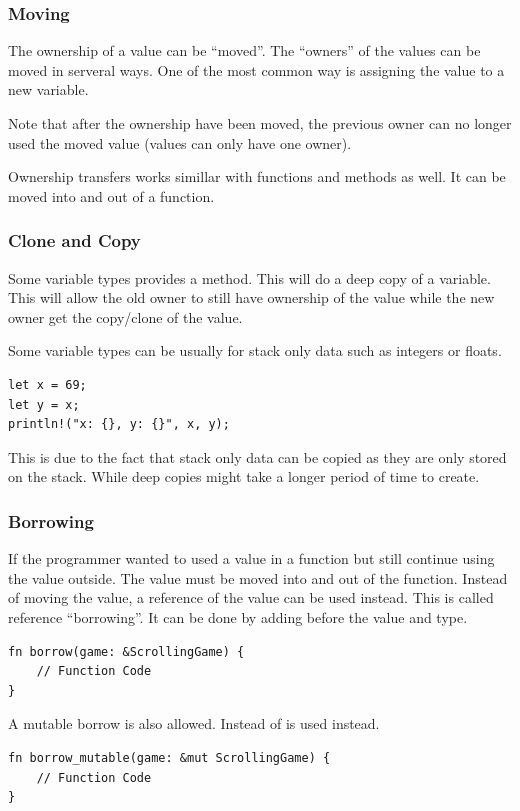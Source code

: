 \documentclass{beamer}
\begin{document}
\begin{frame}[allowframebreaks]
  \frametitle{Moving}
  The ownership of a value can be ``moved''. The ``owners'' of the values can be moved in serveral ways. One of the most common way is assigning the value to a new variable.

  

  \alert{Note} that after the ownership have been moved, the previous owner can no longer used the moved value (values can only have one owner).

  \pagebreak

  Ownership transfers works simillar with functions and methods as well. It can be moved into and out of a function.
  
  

  \pagebreak
  
\end{frame}

\begin{frame}[fragile]
  \frametitle{Clone and Copy}
  Some variable types provides a  method. This will do a deep copy of a variable. This will allow the old owner to still have ownership of the value while the new owner get the copy/clone of the value.

  Some variable types can be  usually for stack only data such as integers or floats.
\begin{lstlisting}
let x = 69;
let y = x;
println!("x: {}, y: {}", x, y);
\end{lstlisting}
  This is due to the fact that stack only data can be copied as they are only stored on the stack. While deep copies might take a longer period of time to create.
\end{frame}

\begin{frame}[fragile]
  \frametitle{Borrowing}
  If the programmer wanted to used a value in a function but still continue using the value outside. The value must be moved into and out of the function. Instead of moving the value, a reference of the value can be used instead. This is called reference ``borrowing''. It can be done by adding \inlinecode{\&} before the value and type.
\begin{lstlisting}
fn borrow(game: &ScrollingGame) {
    // Function Code
}
\end{lstlisting}

  A mutable borrow is also allowed. Instead of \inlinecode{\&}  is used instead.
\begin{lstlisting}
fn borrow_mutable(game: &mut ScrollingGame) {
    // Function Code
}
\end{lstlisting}
\end{frame}
\end{document}
